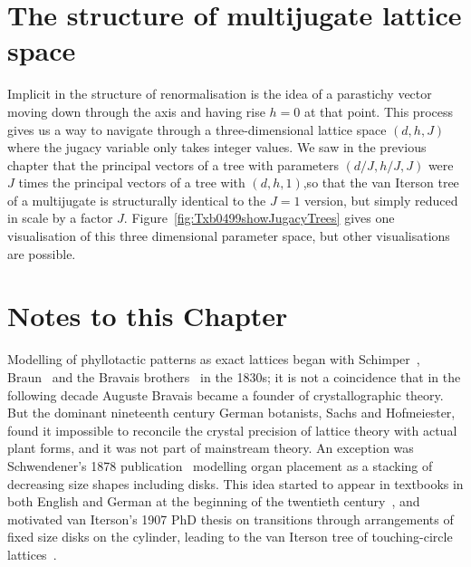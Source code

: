 \section{The structure of multijugate lattice space}
\label{sec:Jlattice}
Implicit in the structure of renormalisation is the idea of a parastichy vector moving down through the axis and having rise $h=0$ at that point. This process gives us a way to navigate through a three-dimensional lattice space $(d,h,J)$ where the jugacy variable only takes integer values. We saw in the previous chapter that the principal vectors of a tree with parameters $(d/J,h/J,J)$ were $J$ times the principal vectors of a tree with $(d,h,1)$,so that the van Iterson tree of a multijugate is structurally identical to the $J=1$ version, but simply reduced in scale by a factor $J$.  Figure~\ref{fig:Txb0499showJugacyTrees} gives one visualisation of this three dimensional parameter space, but other visualisations are possible. 

\section{Notes to this Chapter}%

Modelling of phyllotactic patterns as exact lattices began with Schimper~\cite{schimperBeschreibungSymphytumZeyheri1835}, Braun~\cite{braunBetrachtungenUeberErscheinung1851} and the Bravais brothers~\cite{bravaisEssaiDispositionFeuilles1837} in the 1830s; it is not a coincidence that in the following decade Auguste Bravais became a founder of crystallographic theory. But the dominant nineteenth century German botanists, Sachs and Hofmeiester, found it impossible to reconcile the crystal precision of lattice theory with actual plant forms, and it was not part of mainstream theory. An exception was Schwendener's 1878 publication~\cite{schwendenerMechanischeTheorieBlattstellungen1878} modelling organ placement as a stacking of decreasing size shapes including disks.
This idea started to appear in textbooks in both English and German at the beginning of the twentieth century~\cite{weisseSketchMechanicalHypothesis1900}, and motivated van Iterson's 1907 PhD thesis on transitions through arrangements of fixed size disks on the cylinder, leading to the van Iterson tree of touching-circle lattices~\cite{vanitersonjrMathematischeUndMikroscopischAnatomische1907}. 

